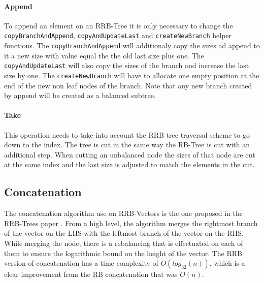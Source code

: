 
\paragraph{Append}
To append an element on an RRB-Tree it is only necessary to change the \texttt{copyBranchAndAppend},  \texttt{copyAndUpdateLast} and \texttt{createNewBranch} helper functions. The \texttt{copyBranchAndAppend} will additionaly copy the sizes ad append to it a new size with value equal the the old last size plus one. The \texttt{copyAndUpdateLast} will also copy the sizes of the branch and increase the last size by one. The \texttt{createNewBranch} will have to allocate one empty position at the end of the new non leaf nodes of the branch. Note that any new branch created by append will be created as a balanced subtree.


\paragraph{Take}
This operation needs to take into account the RRB tree traversal scheme to go down to the index. The tree is cut in the same way the RB-Tree is cut with an additional step. When cutting an unbalanced node the sizes of that node are cut at the same index and the last size is adjusted to match the elements in the cut. 


\subsection{Concatenation}
The concatenation algorithm use on RRB-Vectors is the one proposed in the RRB-Trees paper \cite{RRBTrees}. From a high level, the algorithm merges the rightmost branch of the vector on the LHS with the leftmost branch of the vector on the RHS. While merging the node, there is a rebalancing that is effectuated on each of them to ensure the logarithmic bound on the height of the vector. The RRB version of concatenation has a time complexity of $O(log_{32}(n))$, which is a clear improvement from the RB concatenation that was $O(n)$.
 
